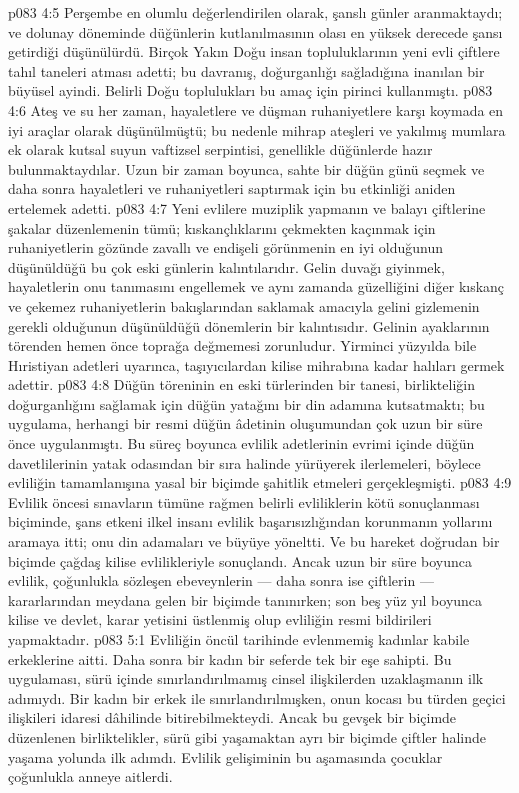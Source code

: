 \vs p083 4:5 Perşembe en olumlu değerlendirilen olarak, şanslı günler aranmaktaydı; ve dolunay döneminde düğünlerin kutlanılmasının olası en yüksek derecede şansı getirdiği düşünülürdü. Birçok Yakın Doğu insan topluluklarının yeni evli çiftlere tahıl taneleri atması adetti; bu davranış, doğurganlığı sağladığına inanılan bir büyüsel ayindi. Belirli Doğu toplulukları bu amaç için pirinci kullanmıştı.
\vs p083 4:6 Ateş ve su her zaman, hayaletlere ve düşman ruhaniyetlere karşı koymada en iyi araçlar olarak düşünülmüştü; bu nedenle mihrap ateşleri ve yakılmış mumlara ek olarak kutsal suyun vaftizsel serpintisi, genellikle düğünlerde hazır bulunmaktaydılar. Uzun bir zaman boyunca, sahte bir düğün günü seçmek ve daha sonra hayaletleri ve ruhaniyetleri saptırmak için bu etkinliği aniden ertelemek adetti.
\vs p083 4:7 Yeni evlilere muziplik yapmanın ve balayı çiftlerine şakalar düzenlemenin tümü; kıskançlıklarını çekmekten kaçınmak için ruhaniyetlerin gözünde zavallı ve endişeli görünmenin en iyi olduğunun düşünüldüğü bu çok eski günlerin kalıntılarıdır. Gelin duvağı giyinmek, hayaletlerin onu tanımasını engellemek ve aynı zamanda güzelliğini diğer kıskanç ve çekemez ruhaniyetlerin bakışlarından saklamak amacıyla gelini gizlemenin gerekli olduğunun düşünüldüğü dönemlerin bir kalıntısıdır. Gelinin ayaklarının törenden hemen önce toprağa değmemesi zorunludur. Yirminci yüzyılda bile Hıristiyan adetleri uyarınca, taşıyıcılardan kilise mihrabına kadar halıları germek adettir.
\vs p083 4:8 Düğün töreninin en eski türlerinden bir tanesi, birlikteliğin doğurganlığını sağlamak için düğün yatağını bir din adamına kutsatmaktı; bu uygulama, herhangi bir resmi düğün âdetinin oluşumundan çok uzun bir süre önce uygulanmıştı. Bu süreç boyunca evlilik adetlerinin evrimi içinde düğün davetlilerinin yatak odasından bir sıra halinde yürüyerek ilerlemeleri, böylece evliliğin tamamlanışına yasal bir biçimde şahitlik etmeleri gerçekleşmişti.
\vs p083 4:9 Evlilik öncesi sınavların tümüne rağmen belirli evliliklerin kötü sonuçlanması biçiminde, şans etkeni ilkel insanı evlilik başarısızlığından korunmanın yollarını aramaya itti; onu din adamaları ve büyüye yöneltti. Ve bu hareket doğrudan bir biçimde çağdaş kilise evlilikleriyle sonuçlandı. Ancak uzun bir süre boyunca evlilik, çoğunlukla sözleşen ebeveynlerin --- daha sonra ise çiftlerin --- kararlarından meydana gelen bir biçimde tanınırken; son beş yüz yıl boyunca kilise ve devlet, karar yetisini üstlenmiş olup evliliğin resmi bildirileri yapmaktadır.
\vs p083 5:1 Evliliğin öncül tarihinde evlenmemiş kadınlar kabile erkeklerine aitti. Daha sonra bir kadın bir seferde tek bir eşe sahipti. Bu  uygulaması, sürü içinde sınırlandırılmamış cinsel ilişkilerden uzaklaşmanın ilk adımıydı. Bir kadın bir erkek ile sınırlandırılmışken, onun kocası bu türden geçici ilişkileri idaresi dâhilinde bitirebilmekteydi. Ancak bu gevşek bir biçimde düzenlenen birliktelikler, sürü gibi yaşamaktan ayrı bir biçimde çiftler halinde yaşama yolunda ilk adımdı. Evlilik gelişiminin bu aşamasında çocuklar çoğunlukla anneye aitlerdi.
